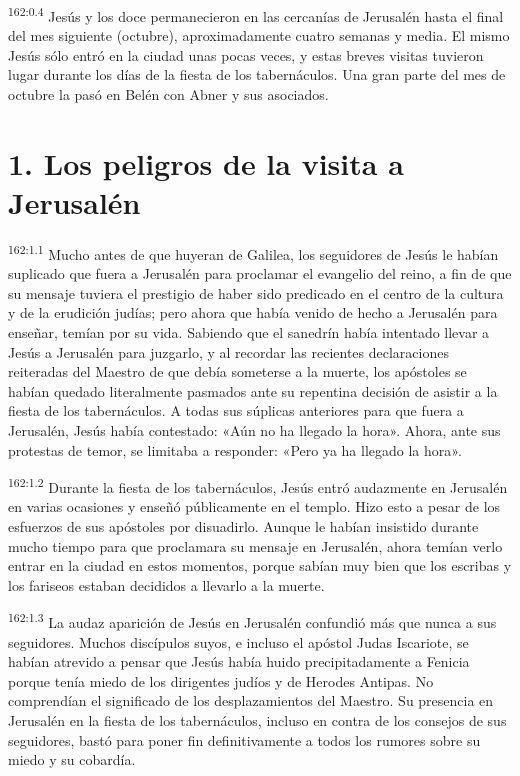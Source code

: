 \par 
\textsuperscript{162:0.4} Jesús y los doce permanecieron en las cercanías de Jerusalén hasta el final del mes siguiente (octubre), aproximadamente cuatro semanas y media. El mismo Jesús sólo entró en la ciudad unas pocas veces, y estas breves visitas tuvieron lugar durante los días de la fiesta de los tabernáculos. Una gran parte del mes de octubre la pasó en Belén con Abner y sus asociados.

\section*{1. Los peligros de la visita a Jerusalén}
\par 
\textsuperscript{162:1.1} Mucho antes de que huyeran de Galilea, los seguidores de Jesús le habían suplicado que fuera a Jerusalén para proclamar el evangelio del reino, a fin de que su mensaje tuviera el prestigio de haber sido predicado en el centro de la cultura y de la erudición judías; pero ahora que había venido de hecho a Jerusalén para enseñar, temían por su vida. Sabiendo que el sanedrín había intentado llevar a Jesús a Jerusalén para juzgarlo, y al recordar las recientes declaraciones reiteradas del Maestro de que debía someterse a la muerte, los apóstoles se habían quedado literalmente pasmados ante su repentina decisión de asistir a la fiesta de los tabernáculos. A todas sus súplicas anteriores para que fuera a Jerusalén, Jesús había contestado: «Aún no ha llegado la hora». Ahora, ante sus protestas de temor, se limitaba a responder: «Pero ya ha llegado la hora».

\par 
\textsuperscript{162:1.2} Durante la fiesta de los tabernáculos, Jesús entró audazmente en Jerusalén en varias ocasiones y enseñó públicamente en el templo. Hizo esto a pesar de los esfuerzos de sus apóstoles por disuadirlo. Aunque le habían insistido durante mucho tiempo para que proclamara su mensaje en Jerusalén, ahora temían verlo entrar en la ciudad en estos momentos, porque sabían muy bien que los escribas y los fariseos estaban decididos a llevarlo a la muerte.

\par 
\textsuperscript{162:1.3} La audaz aparición de Jesús en Jerusalén confundió más que nunca a sus seguidores. Muchos discípulos suyos, e incluso el apóstol Judas Iscariote, se habían atrevido a pensar que Jesús había huido precipitadamente a Fenicia porque tenía miedo de los dirigentes judíos y de Herodes Antipas. No comprendían el significado de los desplazamientos del Maestro. Su presencia en Jerusalén en la fiesta de los tabernáculos, incluso en contra de los consejos de sus seguidores, bastó para poner fin definitivamente a todos los rumores sobre su miedo y su cobardía.

